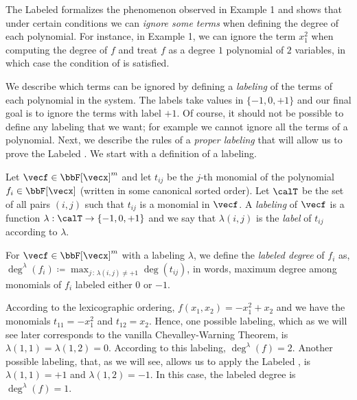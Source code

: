  The Labeled \CWT formalizes the phenomenon
observed in Example 1 and shows that under certain conditions we can
\textit{ignore some terms} when defining the degree of each polynomial.
For instance, in Example 1, we can ignore the term
$x_1^2$ when computing the degree of $f$ and treat $f$ as a degree $1$
polynomial of $2$ variables, in which case the condition of \CWT is
satisfied.

We describe which terms can be ignored by defining a \textit{labeling}
of the terms of each polynomial in the system. The labels take values in
$\{-1, 0, +1\}$ and our final goal is to ignore the terms with label
$+1$. Of course, it should not be possible to define any labeling that
we want; for example we cannot ignore all the terms of a polynomial.
Next, we describe the rules of a \textit{proper labeling} that will
allow us to prove the Labeled \CWT. We start with
a definition of a labeling.

\begin{definition}
  \label{def:monomiallabeling}
     Let $\vecf \in \bbF[\vecx]^m$ and let $t_{i j}$ be the $j$-th monomial of the polynomial $f_i \in \bbF[\vecx]$ (written in some canonical sorted order). Let $\calT$ be the
  set of all pairs $(i, j)$ such that $t_{i j}$ is a monomial in
  $\vecf$. A \textit{labeling} of $\vecf$ is a function
  $\lambda : \calT \to \{-1, 0, +1\}$ and we say that $\lambda(i, j)$
  is the \textit{label} of $t_{i j}$ according to $\lambda$.
\end{definition}

\begin{definition} \label{def:labeledDegree}
    For $\vecf \in \bbF[\vecx]^m$ with a labeling $\lambda$,     we define the \textit{labeled degree} of $f_i$ as,
      $ \deg^{\lambda}(f_i)\coloneqq \max_{j\,:\,\lambda(i, j) \ne +1} \deg(t_{i j})$, in words, maximum degree among monomials of $f_i$ labeled either $0$ or $-1$.
\end{definition}

 According to the lexicographic ordering,
$f(x_1, x_2) = - x_1^2 + x_2$ and we have the monomials
$t_{1 1} = - x_1^2$ and $t_{1 2} = x_2$. Hence, one possible labeling,
which as we will see later corresponds to the vanilla Chevalley-Warning
Theorem, is $\lambda(1, 1) = \lambda(1, 2) = 0$. According to this labeling,
$\deg^{\lambda}(f) = 2$. Another possible
labeling, that, as we will see, allows us to apply the Labeled
\CWT\!, is $\lambda(1, 1) = +1$ and $\lambda(1, 2) = -1$.
In this case, the labeled degree is $\deg^{\lambda}(f) = 1$.
\bigskip

